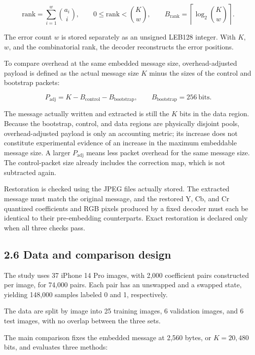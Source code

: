 \documentclass[
  11pt,
  a4paper,
]{article}
\begin{document}
\[
\mathrm{rank} = \sum_{i=1}^{w}\binom{a_i}{i}, \qquad
0 \le \mathrm{rank} < \binom{K}{w}, \qquad
B_{\mathrm{rank}} = \left\lceil\log_2\binom{K}{w}\right\rceil. \tag{12}
\]

The error count \(w\) is stored separately as an unsigned LEB128
integer. With \(K\), \(w\), and the combinatorial rank, the decoder
reconstructs the error positions.

To compare overhead at the same embedded message size, overhead-adjusted
payload is defined as the actual message size \(K\) minus the sizes of
the control and bootstrap packets:

\[
P_{\mathrm{adj}} = K - B_{\mathrm{control}} - B_{\mathrm{bootstrap}}, \qquad B_{\mathrm{bootstrap}} = 256\ \text{bits}. \tag{13}
\]

The message actually written and extracted is still the \(K\) bits in
the data region. Because the bootstrap, control, and data regions are
physically disjoint pools, overhead-adjusted payload is only an
accounting metric; its increase does not constitute experimental
evidence of an increase in the maximum embeddable message size. A larger
\(P_{\mathrm{adj}}\) means less packet overhead for the same message
size. The control-packet size already includes the correction map, which
is not subtracted again.

Restoration is checked using the JPEG files actually stored. The
extracted message must match the original message, and the restored Y,
Cb, and Cr quantized coefficients and RGB pixels produced by a fixed
decoder must each be identical to their pre-embedding counterparts.
Exact restoration is declared only when all three checks pass.

\subsection*{2.6 Data and comparison
design}\label{data-and-comparison-design}

The study uses 37 iPhone 14 Pro images, with 2,000 coefficient pairs
constructed per image, for 74,000 pairs. Each pair has an unswapped and
a swapped state, yielding 148,000 samples labeled 0 and 1, respectively.

The data are split by image into 25 training images, 6 validation
images, and 6 test images, with no overlap between the three sets.

The main comparison fixes the embedded message at 2,560 bytes, or
\(K=20,480\) bits, and evaluates three methods:
\end{document}
